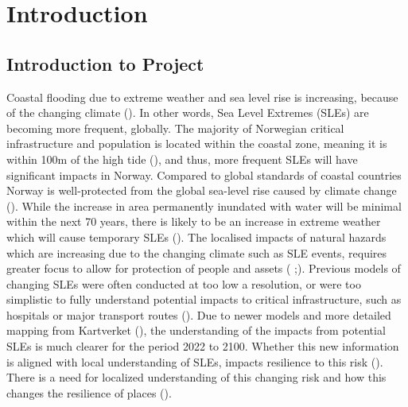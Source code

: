 




\chapter{Introduction}
\section{Introduction to Project}
Coastal flooding due to extreme weather and sea level rise is increasing, because of the changing climate (\cite{hoffken_effects_2020}).  In other words, Sea Level Extremes (SLEs) are becoming more frequent, globally. The majority of Norwegian critical infrastructure and population is located within the coastal zone, meaning it is within 100m of the high tide (\cite{engebakken_construction_2022}), and thus, more frequent SLEs will have significant impacts in Norway. Compared to global standards of coastal countries Norway is well-protected from the global sea-level rise caused by climate change (\cite{aunan_strong_2008}). While the increase in area permanently inundated with water will be minimal within the next 70 years, there is likely to be an increase in extreme weather which will cause temporary SLEs (\cite{aunan_strong_2008}). The localised impacts of natural hazards which are increasing due to the changing climate such as SLE events, requires greater focus to allow for protection of people and assets (\cite{lujala_quantifying_2014} ;\cite{aunan_strong_2008}). Previous models of changing SLEs were often conducted at too low a resolution, or were too simplistic to fully understand potential impacts to critical infrastructure, such as hospitals or major transport routes (\cite{hoffken_effects_2020}). Due to newer models and more detailed mapping from Kartverket (\cite{kartverket_se_2021}), the understanding of the impacts from potential SLEs is much clearer for the period 2022 to 2100. Whether this new information is aligned with local understanding of SLEs, impacts resilience to this risk (\cite{setten_we_2019}).  There is a need for localized understanding of this changing risk and how this changes the resilience of places (\cite{rod_integrated_2012}).
